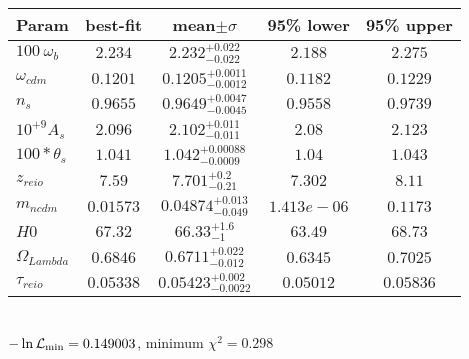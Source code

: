 \begin{tabular}{|l|c|c|c|c|} 
 \hline 
Param & best-fit & mean$\pm\sigma$ & 95\% lower & 95\% upper \\ \hline 
$100~\omega{}_{b }$ &$2.234$ & $2.232_{-0.022}^{+0.022}$ & $2.188$ & $2.275$ \\ 
$\omega{}_{cdm }$ &$0.1201$ & $0.1205_{-0.0012}^{+0.0011}$ & $0.1182$ & $0.1229$ \\ 
$n_{s }$ &$0.9655$ & $0.9649_{-0.0045}^{+0.0047}$ & $0.9558$ & $0.9739$ \\ 
$10^{+9}A_{s }$ &$2.096$ & $2.102_{-0.011}^{+0.011}$ & $2.08$ & $2.123$ \\ 
$100*\theta{}_{s }$ &$1.041$ & $1.042_{-0.0009}^{+0.00088}$ & $1.04$ & $1.043$ \\ 
$z_{reio }$ &$7.59$ & $7.701_{-0.21}^{+0.2}$ & $7.302$ & $8.11$ \\ 
$m_{ncdm }$ &$0.01573$ & $0.04874_{-0.049}^{+0.013}$ & $1.413e-06$ & $0.1173$ \\ 
$H0$ &$67.32$ & $66.33_{-1}^{+1.6}$ & $63.49$ & $68.73$ \\ 
$\Omega{}_{Lambda }$ &$0.6846$ & $0.6711_{-0.012}^{+0.022}$ & $0.6345$ & $0.7025$ \\ 
$\tau{}_{reio }$ &$0.05338$ & $0.05423_{-0.0022}^{+0.002}$ & $0.05012$ & $0.05836$ \\ 
\hline 
 \end{tabular} \\ 
$-\ln{\cal L}_\mathrm{min} =0.149003$, minimum $\chi^2=0.298$ \\ 
